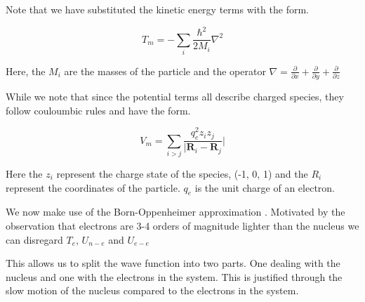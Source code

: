 Note that we have substituted the kinetic energy terms with the form. 

\begin {equation}
T_m = - \sum_i \frac{\hbar^2}{2M_i} \nabla^2
\end {equation}

Here, the $M_i$ are the masses of the particle and the operator $\nabla = \frac{\partial}{\partial x} + \frac{\partial }{\partial y} + \frac{\partial}{\partial z} $

While we note that since the potential terms all describe charged species, they follow couloumbic rules and have the form.

\begin{equation}
	V_m = \sum_{i>j} \frac{q_e^2 z_i z_j }{|\textbf{R}_i-\textbf{R}_j}|
\end{equation}

Here the $z_i$ represent the charge state of the species, (-1, 0, 1) and the $R_i$ represent the coordinates of the particle. $q_e$ is the unit charge of an electron.

We now make use of the Born-Oppenheimer approximation \cite{Born1927}. Motivated by the observation that electrons are 3-4 orders of magnitude lighter than the nucleus we can disregard $T_e$, $U_{n-e}$ and $U_{e-e}$

This allows us to split the wave function into two parts. One dealing with the nucleus and one with the electrons in the system. This is justified through the slow motion of the nucleus compared to the electrons in the system.
